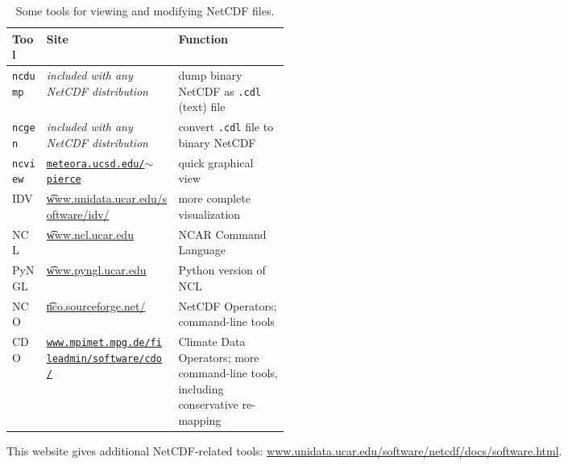 \newcommand{\netcdftool}[1]{#1\index{NetCDF!tools!#1}}
\begin{table}[ht]
\centering
\caption{Some tools for viewing and modifying NetCDF files.}\label{tab:NetCDFview} 
\small
\begin{tabular}{llp{0.4\linewidth}}
  \\\toprule
  \textbf{Tool} & \textbf{Site} & \textbf{Function}\\ \midrule
\netcdftool{\texttt{ncdump}} & \emph{included with any NetCDF distribution} & dump binary NetCDF as \texttt{.cdl} (text) file \\
\netcdftool{\texttt{ncgen}} & \emph{included with any NetCDF distribution} & convert \texttt{.cdl} file to binary NetCDF \\
\netcdftool{\texttt{ncview}} & \href{http://meteora.ucsd.edu/~pierce/ncview_home_page.html}{\texttt{meteora.ucsd.edu/$\sim$pierce}} & quick graphical view \\
\netcdftool{IDV} & \href{http://www.unidata.ucar.edu/software/idv/}{\t{www.unidata.ucar.edu/software/idv/}} & more complete visualization \\
\netcdftool{NCL} &  \href{http://www.ncl.ucar.edu}{\t{www.ncl.ucar.edu}} & NCAR Command Language\\
\netcdftool{PyNGL} &  \href{http://www.pyngl.ucar.edu}{\t{www.pyngl.ucar.edu}} & Python version of NCL\\
\netcdftool{NCO}\index{NCO (NetCDF Operators)} & \href{http://nco.sourceforge.net/}{\t{nco.sourceforge.net/}} & NetCDF Operators; command-line tools\\
\netcdftool{CDO} & \href{http://code.zmaw.de/projects/cdo}{\texttt{www.mpimet.mpg.de/fileadmin/software/cdo/}} & Climate Data Operators; more command-line tools, including conservative re-mapping
\\\bottomrule
\end{tabular}
\normalsize
\end{table}

This website gives additional NetCDF-related tools: \href{http://www.unidata.ucar.edu/software/netcdf/docs/software.html}{www.unidata.ucar.edu/software/netcdf/docs/software.html}.




